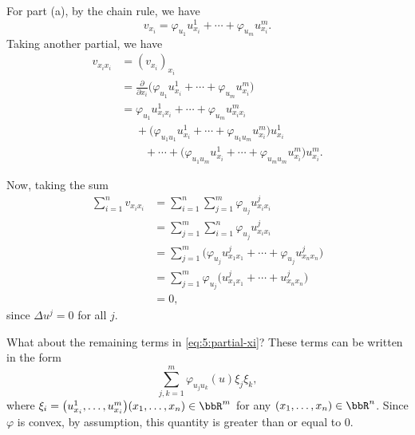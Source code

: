\begin{solution}
  For part (a), by the chain rule, we have
  \[
    v_{x_i}=\varphi_{u_1}u^1_{x_i}+\dotsb+\varphi_{u_m}u^m_{x_i}.
  \]
  Taking another partial, we have
  \begin{equation}
    \label{eq:5:partial-xi}
    \begin{aligned}
      v_{x_ix_i}
      &=(v_{x_i})_{x_i}\\
      &=\frac{\partial}{\partial x_i}
      \bigl(\varphi_{u_1}u^1_{x_i}+\dotsb+\varphi_{u_m}u^m_{x_i}\bigr)\\
      &=\varphi_{u_1}u^1_{x_ix_i}+\dotsb+\varphi_{u_m}u_{x_ix_i}^m\\
      &\phantom{{}={}}+\bigl(\varphi_{u_1u_1}u_{x_i}^1
      +\dotsb+\varphi_{u_1u_m}u_{x_i}^m\bigr)u_{x_i}^1\\
      &\phantom{{}=+{}}+\dotsb+\bigl(\varphi_{u_1u_m}u_{x_i}^1
      +\dotsb+\varphi_{u_mu_m}u_{x_i}^m\bigr)u_{x_i}^m.
    \end{aligned}
  \end{equation}

  Now, taking the sum
  \begin{align*}
    \sum_{i=1}^nv_{x_ix_i}
    &=\sum_{i=1}^n\sum_{j=1}^m\varphi_{u_j}u^j_{x_ix_i}\\
    &=\sum_{j=1}^m\sum_{i=1}^n\varphi_{u_j}u^j_{x_ix_i}\\
    &=\sum_{j=1}^m\bigl(\varphi_{u_j}u^j_{x_1x_1}+\dotsb+\varphi_{u_j}u^j_{x_nx_n}\bigr)\\
    &=\sum_{j=1}^m\varphi_{u_j}\bigl(u^j_{x_1x_1}+\dotsb+u^j_{x_nx_n}\bigr)\\
    &=0,
  \end{align*}
  since \(\Delta u^j=0\) for all \(j\).

  What about the remaining terms in \eqref{eq:5:partial-xi}? These terms
  can be written in the form
  \[
    \sum_{j,k=1}^m\varphi_{u_ju_k}(u)\xi_j\xi_k,
  \]
  where
  \(\xi_i=\bigl(u^1_{x_i},\dotsc,u^m_{x_i}\bigr)(x_1,\dotsc,x_n)\in\bbR^m\)
  for any \((x_1,\dotsc,x_n)\in\bbR^n\). Since \(\varphi\) is convex, by
  assumption, this quantity is greater than or equal to \(0\).


\end{solution}
